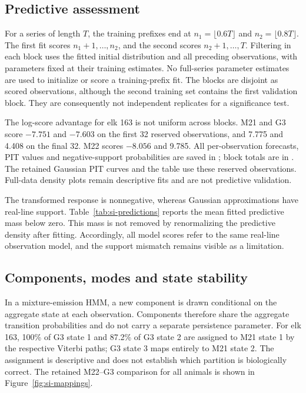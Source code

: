\documentclass[11pt]{article}
\begin{document}
\subsection{Predictive assessment}

For a series of length $T$, the training prefixes end at
$n_1=\lfloor0.6T\rfloor$ and $n_2=\lfloor0.8T\rfloor$. The first fit scores
$n_1+1,\ldots,n_2$, and the second scores $n_2+1,\ldots,T$. Filtering in each
block uses the fitted initial distribution and all preceding observations,
with parameters fixed at their training estimates. No full-series parameter
estimates are used to initialize or score a training-prefix fit. The blocks
are disjoint as scored observations, although the second training set
contains the first validation block. They are consequently not independent
replicates for a significance test.



The log-score advantage for elk 163 is not uniform across blocks. M21 and G3
score $-7.751$ and $-7.603$ on the first 32 reserved observations, and 7.775
and 4.408 on the final 32. M22 scores $-8.056$ and 9.785. All per-observation
forecasts, PIT values and negative-support probabilities are saved in
; block totals are in
. The retained Gaussian PIT curves and the table use these reserved observations. Full-data density
plots remain descriptive fits and are not predictive validation.

The transformed response is nonnegative, whereas Gaussian approximations
have real-line support. Table~\ref{tab:si-predictions} reports the mean fitted
predictive mass below zero. This mass is not removed by renormalizing the
predictive density after fitting. Accordingly, all model scores refer to the
same real-line observation model, and the support mismatch remains visible
as a limitation.

\subsection{Components, modes and state stability}

\begingroup\small{}

\endgroup

In a mixture-emission HMM, a new component is drawn conditional on the
aggregate state at each observation. Components therefore share the
aggregate transition probabilities and do not carry a separate persistence
parameter. For elk 163, 100\% of G3 state 1 and 87.2\% of G3 state 2 are
assigned to M21 state 1 by the respective Viterbi paths; G3 state 3 maps
entirely to M21 state 2. The assignment is descriptive and does not establish
which partition is biologically correct. The retained M22--G3 comparison
for all animals is shown in Figure~\ref{fig:si-mappings}.
\end{document}
